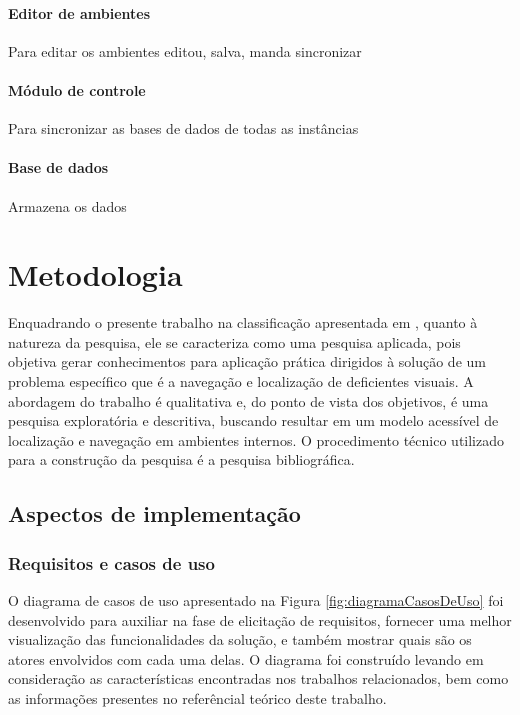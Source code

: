 \documentclass[english,brazilian]{UNISINOSmonografia}
\begin{document}
		\subsubsection{Editor de ambientes}

			Para editar os ambientes
			editou, salva, manda sincronizar

		\subsubsection{Módulo de controle}

			Para sincronizar as bases de dados de todas as instâncias

		\subsubsection{Base de dados}

			Armazena os dados

\chapter{Metodologia}
Enquadrando o presente trabalho na classificação apresentada em , quanto à natureza da pesquisa, ele se caracteriza como uma pesquisa aplicada, pois objetiva gerar conhecimentos para aplicação prática dirigidos à solução de um problema específico que é a navegação e localização de deficientes visuais. A abordagem do trabalho é qualitativa e, do ponto de vista dos objetivos, é uma pesquisa exploratória e descritiva, buscando resultar em um modelo acessível de localização e navegação em ambientes internos. O procedimento técnico utilizado para a construção da pesquisa é a pesquisa bibliográfica.

	\section{Aspectos de implementação}
	
	\subsection{Requisitos e casos de uso} %
O diagrama de casos de uso apresentado na Figura \ref{fig:diagramaCasosDeUso} foi desenvolvido para auxiliar na fase de elicitação de requisitos, fornecer uma melhor visualização das funcionalidades da solução, e também mostrar quais são os atores envolvidos com cada uma delas. O diagrama foi construído levando em consideração as características encontradas nos trabalhos relacionados, bem como as informações presentes no referêncial teórico deste trabalho.
\end{document}
